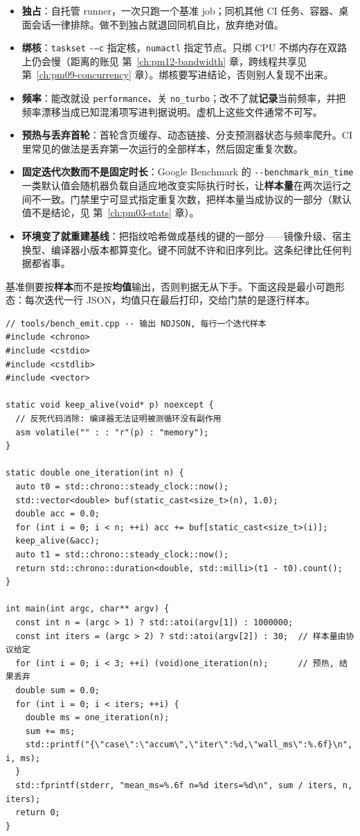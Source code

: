 \documentclass[12pt,a4paper,fontset=fandol]{ctexbook}
\newcommand{\Tp}[1]{\texttt{#1}}
\newcommand{\Opt}[1]{\texttt{-\/-#1}}
\newcommand{\Bk}{\discretionary{}{}{}}
\begin{document}
\begin{itemize}
\item \textbf{独占}：自托管 runner，一次只跑一个基准 job；同机其他 CI 任务、容器、桌面会话一律排除。做不到独占就退回同机自比，放弃绝对值。
\item \textbf{绑核}：\Tp{taskset} \Opt{-c} 指定核，\Tp{numactl} 指定节点。只绑 CPU 不绑内存在双路上仍会慢（距离的账见 第~\ref{ch:pm12-bandwidth} 章，跨线程共享见 第~\ref{ch:pm09-concurrency} 章）。绑核要写进结论，否则别人复现不出来。
\item \textbf{频率}：能改就设 \Tp{performance}、关 \Tp{no{\Bk}\_turbo}；改不了就\textbf{记录}当前频率，并把频率漂移当成已知混淆项写进判据说明。虚机上这些文件通常不可写。
\item \textbf{预热与丢弃首轮}：首轮含页缓存、动态链接、分支预测器状态与频率爬升。CI 里常见的做法是丢弃第一次运行的全部样本，然后固定重复次数。
\item \textbf{固定迭代次数而不是固定时长}：Google Benchmark 的 \Opt{benchmark\_min\_time} 一类默认值会随机器负载自适应地改变实际执行时长，让\textbf{样本量}在两次运行之间不一致。门禁里宁可显式指定重复次数，把样本量当成协议的一部分（默认值不是结论，见 第~\ref{ch:pm03-stats} 章）。
\item \textbf{环境变了就重建基线}：把指纹哈希做成基线的键的一部分——镜像升级、宿主换型、编译器小版本都算变化。键不同就不许和旧序列比。这条纪律比任何判据都省事。
\end{itemize}

基准侧要按\textbf{样本}而不是按\textbf{均值}输出，否则判据无从下手。下面这段是最小可跑形态：每次迭代一行 JSON，均值只在最后打印，交给门禁的是逐行样本。

\begin{lstlisting}[style=cppstyle, caption={CI 友好的基准输出骨架：每个迭代单独成行、
显式重复次数、防死代码消除。数值不填，由读者在自己的机器上产出}, label={lst:pm13-sample}]
// tools/bench_emit.cpp -- 输出 NDJSON, 每行一个迭代样本
#include <chrono>
#include <cstdio>
#include <cstdlib>
#include <vector>

static void keep_alive(void* p) noexcept {
  // 反死代码消除: 编译器无法证明被测循环没有副作用
  asm volatile("" : : "r"(p) : "memory");
}

static double one_iteration(int n) {
  auto t0 = std::chrono::steady_clock::now();
  std::vector<double> buf(static_cast<size_t>(n), 1.0);
  double acc = 0.0;
  for (int i = 0; i < n; ++i) acc += buf[static_cast<size_t>(i)];
  keep_alive(&acc);
  auto t1 = std::chrono::steady_clock::now();
  return std::chrono::duration<double, std::milli>(t1 - t0).count();
}

int main(int argc, char** argv) {
  const int n = (argc > 1) ? std::atoi(argv[1]) : 1000000;
  const int iters = (argc > 2) ? std::atoi(argv[2]) : 30;  // 样本量由协议给定
  for (int i = 0; i < 3; ++i) (void)one_iteration(n);      // 预热, 结果丢弃
  double sum = 0.0;
  for (int i = 0; i < iters; ++i) {
    double ms = one_iteration(n);
    sum += ms;
    std::printf("{\"case\":\"accum\",\"iter\":%d,\"wall_ms\":%.6f}\n", i, ms);
  }
  std::fprintf(stderr, "mean_ms=%.6f n=%d iters=%d\n", sum / iters, n, iters);
  return 0;
}
\end{lstlisting}
\end{document}

